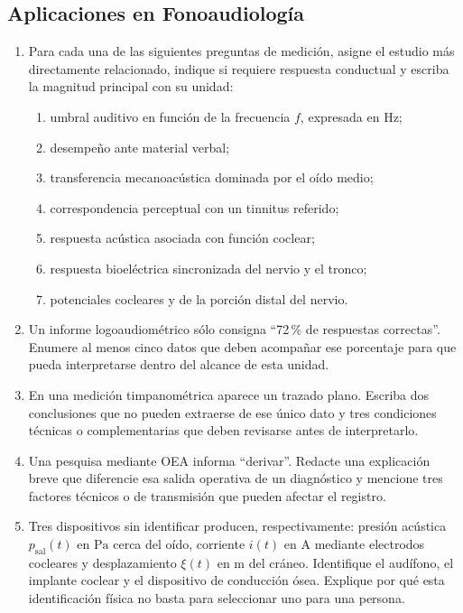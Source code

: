 \subsection*{Aplicaciones en Fonoaudiología}

\begin{enumerate}[label=\textbf{A\arabic*.},leftmargin=*]
    \item Para cada una de las siguientes preguntas de medición, asigne el
    estudio más directamente relacionado, indique si requiere respuesta
    conductual y escriba la magnitud principal con su unidad:
    \begin{enumerate}
        \item umbral auditivo en función de la frecuencia \(f\), expresada en
        \(\mathrm{Hz}\);
        \item desempeño ante material verbal;
        \item transferencia mecanoacústica dominada por el oído medio;
        \item correspondencia perceptual con un tinnitus referido;
        \item respuesta acústica asociada con función coclear;
        \item respuesta bioeléctrica sincronizada del nervio y el tronco;
        \item potenciales cocleares y de la porción distal del nervio.
    \end{enumerate}

    \item Un informe logoaudiométrico sólo consigna ``72\,\% de respuestas
    correctas''. Enumere al menos cinco datos que deben acompañar ese
    porcentaje para que pueda interpretarse dentro del alcance de esta unidad.

    \item En una medición timpanométrica aparece un trazado plano. Escriba dos
    conclusiones que no pueden extraerse de ese único dato y tres condiciones
    técnicas o complementarias que deben revisarse antes de interpretarlo.

    \item Una pesquisa mediante OEA informa ``derivar''. Redacte una
    explicación breve que diferencie esa salida operativa de un diagnóstico y
    mencione tres factores técnicos o de transmisión que pueden afectar el
    registro.

    \item Tres dispositivos sin identificar producen, respectivamente:
    presión acústica \(p_{\mathrm{sal}}(t)\) en \(\mathrm{Pa}\) cerca del oído,
    corriente \(i(t)\) en \(\mathrm{A}\) mediante electrodos cocleares y
    desplazamiento \(\xi(t)\) en \(\mathrm{m}\) del cráneo. Identifique el
    audífono, el implante coclear y el dispositivo de conducción ósea. Explique
    por qué esta identificación física no basta para seleccionar uno para una
    persona.
\end{enumerate}

